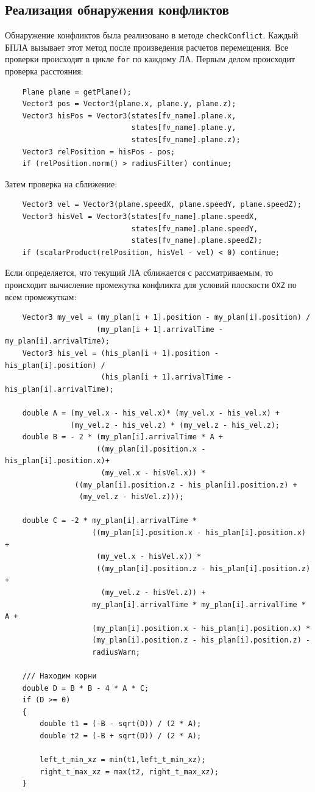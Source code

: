 \documentclass[a4paper,12pt]{article}
\begin{document}
\subsection{Реализация обнаружения конфликтов}
Обнаружение конфликтов была реализовано в методе \texttt{checkConflict}. Каждый БПЛА вызывает этот метод после произведения расчетов перемещения. Все проверки происходят в цикле \texttt{for} по каждому ЛА.
Первым делом происходит проверка расстояния:
\begin{verbatim}
    Plane plane = getPlane();
    Vector3 pos = Vector3(plane.x, plane.y, plane.z);
    Vector3 hisPos = Vector3(states[fv_name].plane.x, 
                             states[fv_name].plane.y, 
                             states[fv_name].plane.z);
    Vector3 relPosition = hisPos - pos;
    if (relPosition.norm() > radiusFilter) continue;
\end{verbatim}
Затем проверка на сближение:
\begin{verbatim}
    Vector3 vel = Vector3(plane.speedX, plane.speedY, plane.speedZ);
    Vector3 hisVel = Vector3(states[fv_name].plane.speedX, 
                             states[fv_name].plane.speedY, 
                             states[fv_name].plane.speedZ);
    if (scalarProduct(relPosition, hisVel - vel) < 0) continue;
\end{verbatim}
Если определяется, что текущий ЛА сближается с рассматриваемым, то происходит вычисление промежутка конфликта  для условий плоскости \texttt{OXZ} по всем промежуткам:
\begin{verbatim}
    Vector3 my_vel = (my_plan[i + 1].position - my_plan[i].position) /
                     (my_plan[i + 1].arrivalTime - my_plan[i].arrivalTime);
    Vector3 his_vel = (his_plan[i + 1].position - his_plan[i].position) /
                      (his_plan[i + 1].arrivalTime - his_plan[i].arrivalTime);
    
    double A = (my_vel.x - his_vel.x)* (my_vel.x - his_vel.x) +
               (my_vel.z - his_vel.z) * (my_vel.z - his_vel.z);
    double B = - 2 * (my_plan[i].arrivalTime * A + 
                     ((my_plan[i].position.x - his_plan[i].position.x)+ 
                      (my_vel.x - hisVel.x)) *
                ((my_plan[i].position.z - his_plan[i].position.z) +
                 (my_vel.z - hisVel.z)));
    
    double C = -2 * my_plan[i].arrivalTime * 
                    ((my_plan[i].position.x - his_plan[i].position.x) + 
                     (my_vel.x - hisVel.x)) * 
                     ((my_plan[i].position.z - his_plan[i].position.z) + 
                      (my_vel.z - hisVel.z)) + 
                    my_plan[i].arrivalTime * my_plan[i].arrivalTime * A +
                    (my_plan[i].position.x - his_plan[i].position.x) *
                    (my_plan[i].position.z - his_plan[i].position.z) - 
                    radiusWarn;
    
    /// Находим корни
    double D = B * B - 4 * A * C;
    if (D >= 0) 
    {
        double t1 = (-B - sqrt(D)) / (2 * A);
        double t2 = (-B + sqrt(D)) / (2 * A);
        
        left_t_min_xz = min(t1,left_t_min_xz);
        right_t_max_xz = max(t2, right_t_max_xz);
    }
\end{verbatim}
\end{document}
